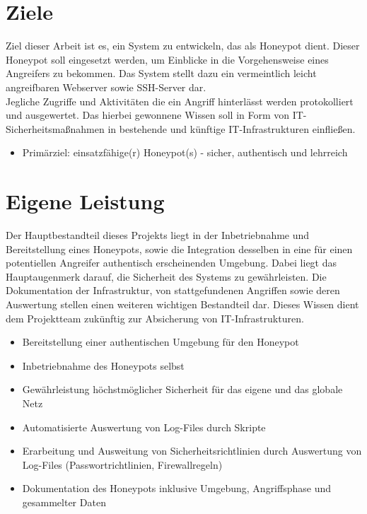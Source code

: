 \newpage


\section{Ziele}
\label{sec:Ziele}

Ziel dieser Arbeit ist es, ein System zu entwickeln, das als Honeypot dient. Dieser Honeypot soll eingesetzt werden, um Einblicke in die Vorgehensweise eines Angreifers zu bekommen. 
Das System stellt dazu ein vermeintlich leicht angreifbaren Webserver sowie SSH-Server dar.\\


Jegliche Zugriffe und Aktivitäten die ein Angriff hinterlässt werden protokolliert und ausgewertet. Das hierbei gewonnene Wissen soll in Form von IT-Sicherheitsmaßnahmen in bestehende und künftige IT-Infrastrukturen einfließen.

\begin{itemize}
\item Primärziel: einsatzfähige(r) Honeypot(s) - sicher, authentisch und lehrreich
\end{itemize}




\section{Eigene Leistung}
\label{sec:Eigene Leistung}

Der Hauptbestandteil dieses Projekts liegt in der Inbetriebnahme und Bereitstellung eines Honeypots, sowie die Integration desselben in eine für einen potentiellen Angreifer authentisch erscheinenden Umgebung. Dabei liegt das Hauptaugenmerk darauf, die Sicherheit des Systems zu gewährleisten. Die Dokumentation der Infrastruktur, von stattgefundenen Angriffen sowie deren Auswertung stellen einen weiteren wichtigen Bestandteil dar. Dieses Wissen dient dem Projektteam zukünftig zur Absicherung von IT-Infrastrukturen.

\begin{itemize}
\item Bereitstellung einer authentischen Umgebung für den Honeypot
\item Inbetriebnahme des Honeypots selbst
\item Gewährleistung höchstmöglicher Sicherheit für das eigene und das globale Netz
\item Automatisierte Auswertung von Log-Files durch Skripte
\item Erarbeitung und Ausweitung von Sicherheitsrichtlinien durch Auswertung von Log-Files (Passwortrichtlinien, Firewallregeln)
\item Dokumentation des Honeypots inklusive Umgebung, Angriffsphase und gesammelter Daten
\end{itemize}

